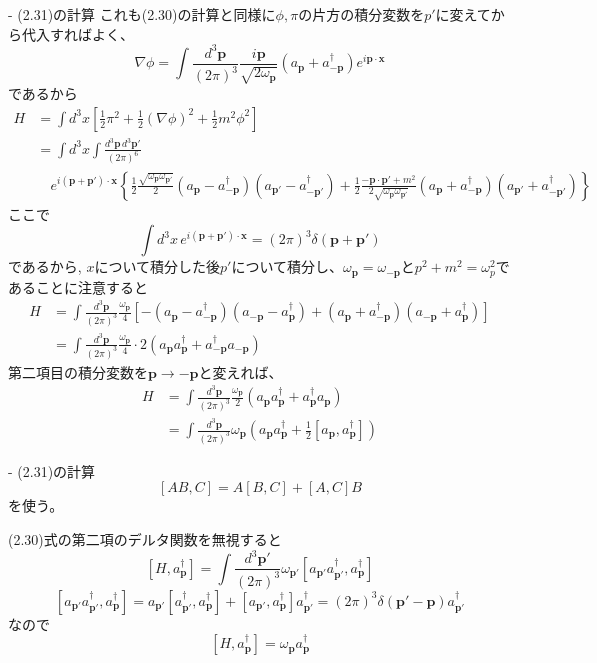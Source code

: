 \documentclass[a4paper]{ltjsarticle}
\begin{document}
- (2.31)の計算
これも(2.30)の計算と同様に$\phi, \pi$の片方の積分変数を$p'$に変えてから代入すればよく、
\[
  \nabla \phi = \int \frac{d^3\bm{p}}{(2\pi)^3} \frac{i\bm{p}}{\sqrt{2\omega_{\bm{p}}}} ( a_{\bm{p}} + a_{-\bm{p}}^\dagger ) e^{i \bm{p} \cdot \bm{x}}
\]
であるから
\begin{align*}
  H & = \int d^3x \left[ \frac{1}{2}\pi^2 + \frac{1}{2}(\nabla \phi)^2 + \frac{1}{2}m^2 \phi^2 \right] \\
    & = \int d^3x \int \frac{d^3\bm{p} \, d^3\bm{p}'}{(2\pi)^6} \\
    & \quad e^{i(\bm{p}+\bm{p}') \cdot \bm{x}} \left\{
  \frac{1}{2} \frac{\sqrt{\omega_{\bm{p}} \omega_{\bm{p}'}}}{2} (a_{\bm{p}} - a^\dagger_{-\bm{p}})(a_{\bm{p}'} - a^\dagger_{-\bm{p}'}) + \frac{1}{2} \frac{-\bm{p} \cdot \bm{p}' + m^2}{2\sqrt{\omega_{\bm{p}} \omega_{\bm{p}'}}} (a_{\bm{p}} + a^\dagger_{-\bm{p}})(a_{\bm{p}'} + a^\dagger_{-\bm{p}'})
  \right\}
\end{align*}
ここで
\[
  \int d^3x \, e^{i(\bm{p}+\bm{p}') \cdot \bm{x}} = (2\pi)^3 \delta(\bm{p}+\bm{p}')
\]
であるから, $x$について積分した後$p'$について積分し、$\omega_{\bm{p}} = \omega_{-\bm{p}}$と$p^2 + m^2 = \omega_p^2$であることに注意すると
\begin{align*}
  H
   & = \int \frac{d^3\bm{p}}{(2\pi)^3} \frac{\omega_{\bm{p}}}{4} [-(a_{\bm{p}} - a_{-\bm{p}}^\dagger)(a_{-\bm{p}} - a_{\bm{p}}^\dagger) + (a_{\bm{p}} + a_{-\bm{p}}^\dagger)(a_{-\bm{p}} + a_{\bm{p}}^\dagger)] \\
   & = \int \frac{d^3\bm{p}}{(2\pi)^3} \frac{\omega_{\bm{p}}}{4} \cdot 2(a_{\bm{p}} a_{\bm{p}}^\dagger + a_{-\bm{p}}^\dagger a_{-\bm{p}})
\end{align*}
第二項目の積分変数を$\bm{p} \to -\bm{p}$と変えれば、
\begin{align*}
  H & = \int \frac{d^3\bm{p}}{(2\pi)^3} \frac{\omega_{\bm{p}}}{2} (a_{\bm{p}} a_{\bm{p}}^\dagger + a_{\bm{p}}^\dagger a_{\bm{p}}) \\
    & = \int \frac{d^3\bm{p}}{(2\pi)^3} \omega_{\bm{p}} (a_{\bm{p}} a_{\bm{p}}^\dagger + \frac{1}{2}[a_{\bm{p}}, a_{\bm{p}}^\dagger])
\end{align*}

- (2.31)の計算
\[
  [AB, C] = A[B, C] + [A, C]B
\]
を使う。

(2.30)式の第二項のデルタ関数を無視すると
\[
  [H, a_{\bm{p}}^\dagger] = \int \frac{d^3\bm{p}'}{(2\pi)^3} \omega_{\bm{p}'} [a_{\bm{p}'} a_{\bm{p}'}^\dagger, a_{\bm{p}}^\dagger]
\]
\[
  [a_{\bm{p}'} a_{\bm{p}'}^\dagger, a_{\bm{p}}^\dagger] = a_{\bm{p}'} [a_{\bm{p}'}^\dagger, a_{\bm{p}}^\dagger] + [a_{\bm{p}'}, a_{\bm{p}}^\dagger] a_{\bm{p}'}^\dagger = (2\pi)^3 \delta(\bm{p}' - \bm{p}) a_{\bm{p}'}^\dagger
\]
なので
\[
  [H, a_{\bm{p}}^\dagger] = \omega_{\bm{p}} a_{\bm{p}}^\dagger
\]
\end{document}
